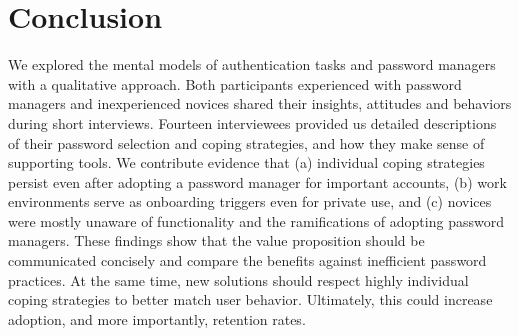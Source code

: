 \section{Conclusion}
We explored the mental models of authentication tasks and password managers with a qualitative approach. Both participants experienced with password managers and inexperienced novices shared their insights, attitudes and behaviors during short interviews. Fourteen interviewees provided us detailed descriptions of their password selection and coping strategies, and how they make sense of supporting tools. 
We contribute evidence that (a) individual coping strategies persist even after adopting a password manager for important accounts, (b) work environments serve as onboarding triggers even for private use, and (c) novices were mostly unaware of functionality and the ramifications of adopting password managers. 
These findings show that the value proposition should be communicated concisely and compare the benefits against inefficient password practices. At the same time, new solutions should respect highly individual coping strategies to better match user behavior. Ultimately, this could increase adoption, and more importantly, retention rates. 


\noindent
{}




